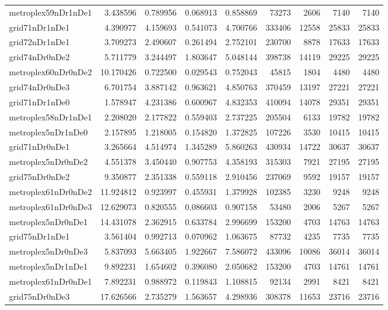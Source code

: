 \begin{longtable}{|l|r|r|r|r|r|r|r|r|}
metroplex59nDr1nDe1 & 3.438596 & 0.789956 & 0.068913 & 0.858869 & 73273 & 2606 & 7140 & 7140 \\
grid71nDr1nDe1 & 4.390977 & 4.159693 & 0.541073 & 4.700766 & 333406 & 12558 & 25833 & 25833 \\
grid72nDr1nDe1 & 3.709273 & 2.490607 & 0.261494 & 2.752101 & 230700 & 8878 & 17633 & 17633 \\
grid74nDr0nDe2 & 5.711779 & 3.244497 & 1.803647 & 5.048144 & 398738 & 14119 & 29225 & 29225 \\
metroplex60nDr0nDe2 & 10.170426 & 0.722500 & 0.029543 & 0.752043 & 45815 & 1804 & 4480 & 4480 \\
grid74nDr0nDe3 & 6.701754 & 3.887142 & 0.963621 & 4.850763 & 370459 & 13197 & 27221 & 27221 \\
grid71nDr1nDe0 & 1.578947 & 4.231386 & 0.600967 & 4.832353 & 410094 & 14078 & 29351 & 29351 \\
metroplex58nDr1nDe1 & 2.208020 & 2.177822 & 0.559403 & 2.737225 & 205504 & 6133 & 19782 & 19782 \\
metroplex5nDr1nDe0 & 2.157895 & 1.218005 & 0.154820 & 1.372825 & 107226 & 3530 & 10415 & 10415 \\
grid71nDr0nDe1 & 3.265664 & 4.514974 & 1.345289 & 5.860263 & 430934 & 14722 & 30637 & 30637 \\
metroplex5nDr0nDe2 & 4.551378 & 3.450440 & 0.907753 & 4.358193 & 315303 & 7921 & 27195 & 27195 \\
grid75nDr0nDe2 & 9.350877 & 2.351338 & 0.559118 & 2.910456 & 237069 & 9592 & 19157 & 19157 \\
metroplex61nDr0nDe2 & 11.924812 & 0.923997 & 0.455931 & 1.379928 & 102385 & 3230 & 9248 & 9248 \\
metroplex61nDr0nDe3 & 12.629073 & 0.820555 & 0.086603 & 0.907158 & 53480 & 2006 & 5267 & 5267 \\
metroplex5nDr0nDe1 & 14.431078 & 2.362915 & 0.633784 & 2.996699 & 153200 & 4703 & 14763 & 14763 \\
grid75nDr1nDe1 & 3.561404 & 0.992713 & 0.070962 & 1.063675 & 87732 & 4235 & 7735 & 7735 \\
metroplex5nDr0nDe3 & 5.837093 & 5.663405 & 1.922667 & 7.586072 & 433096 & 10086 & 36014 & 36014 \\
metroplex5nDr1nDe1 & 9.892231 & 1.654602 & 0.396080 & 2.050682 & 153200 & 4703 & 14761 & 14761 \\
metroplex61nDr0nDe1 & 7.892231 & 0.988972 & 0.119843 & 1.108815 & 92134 & 2991 & 8421 & 8421 \\
grid75nDr0nDe3 & 17.626566 & 2.735279 & 1.563657 & 4.298936 & 308378 & 11653 & 23716 & 23716 \\

\end{longtable}
